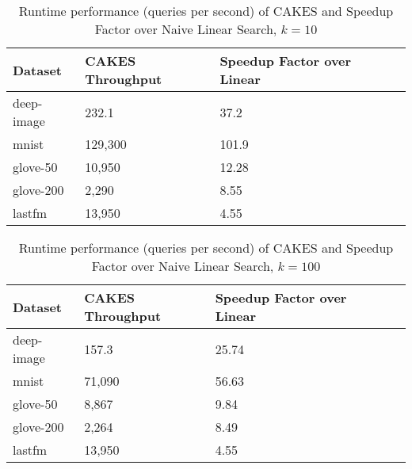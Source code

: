 \begin{table*}[!t]
    \caption{Runtime performance (queries per second) of CAKES and Speedup Factor over Naive Linear Search, $k=10$}
    \label{table:results:ann-alt-10}
    \vskip 0.15in
    \begin{center}
    \begin{small}
    \begin{sc}
    \begin{tabular}{|l|l|l|l|l|}
    \textbf{Dataset} & \textbf{CAKES Throughput} & \textbf{Speedup Factor over Linear} \\
    \hline
    deep-image       & 232.1                     & 37.2      \\
    \hline
    mnist            & 129,300                   & 101.9      \\
    \hline
    glove-50         & 10,950                    & 12.28      \\
    \hline 
    glove-200        & 2,290                     & 8.55     \\
    \hline
    lastfm           & 13,950                    & 4.55           \\
    \hline
    \end{tabular}
    \end{sc}
    \end{small}
    \end{center}
    \vskip -0.1in
    \end{table*}


\begin{table*}[!t]
    \caption{Runtime performance (queries per second) of CAKES and Speedup Factor over Naive Linear Search, $k=100$}
    \label{table:results:ann-alt-100}
    \vskip 0.15in
    \begin{center}
    \begin{small}
    \begin{sc}
    \begin{tabular}{|l|l|l|l|l|l|}
    \textbf{Dataset} & \textbf{CAKES Throughput} & \textbf{Speedup Factor over Linear} \\
    \hline
    deep-image             &157.3 &25.74             \\
    \hline
    mnist                 &71,090 &56.63      \\
    \hline
    glove-50               & 8,867 & 9.84      \\
    \hline 
    glove-200              & 2,264 & 8.49    \\
    \hline
    lastfm                 & 13,950     &4.55                               \\
    \hline
    \end{tabular}
    \end{sc}
    \end{small}
    \end{center}
    \vskip -0.1in
    \end{table*}
    